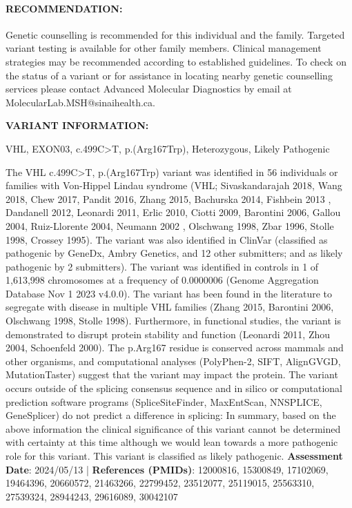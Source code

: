 \documentclass[10pt]{extarticle}
\begin{document}
\paragraph{RECOMMENDATION:} Genetic counselling is recommended for this individual and the family. Targeted variant testing is available for other family members. Clinical management strategies may be recommended according to established guidelines. To check on the status of a variant or for assistance in locating nearby genetic counselling services please contact Advanced Molecular Diagnostics by email at MolecularLab.MSH@sinaihealth.ca.

{\bf VARIANT INFORMATION:}\\
\hdashrule[0.5ex]{\textwidth}{1pt}{1mm}

\vspace{-1ex}
VHL, EXON03, c.499C>T, p.(Arg167Trp), Heterozygous, Likely Pathogenic

\vspace{-1ex}
\hdashrule[0.5ex]{\textwidth}{1pt}{1mm}

The VHL c.499C>T, p.(Arg167Trp) variant was identified in 56 individuals or families with Von-Hippel Lindau syndrome (VHL; Sivaskandarajah 2018, Wang 2018, Chew 2017, Pandit 2016, Zhang 2015, Bachurska 2014, Fishbein 2013 , Dandanell 2012, Leonardi 2011, Erlic 2010, Ciotti 2009, Barontini 2006, Gallou 2004, Ruiz-Llorente 2004, Neumann 2002 , Olschwang 1998, Zbar 1996, Stolle 1998, Crossey 1995). The variant was also identified in ClinVar (classified as pathogenic by GeneDx, Ambry Genetics, and 12 other submitters; and as likely pathogenic by 2 submitters). The variant was identified in controls in 1 of 1,613,998 chromosomes at a frequency of 0.0000006 (Genome Aggregation Database Nov 1 2023 v4.0.0). The variant has been found in the literature to segregate with disease in multiple VHL families (Zhang 2015, Barontini 2006, Olschwang 1998, Stolle 1998). Furthermore, in functional studies, the variant is demonstrated to disrupt protein stability and function (Leonardi 2011, Zhou 2004, Schoenfeld 2000). The p.Arg167 residue is conserved across mammals and other organisms, and computational analyses (PolyPhen-2, SIFT, AlignGVGD, MutationTaster) suggest that the variant may impact the protein. The variant occurs outside of the splicing consensus sequence and in silico or computational prediction software programs (SpliceSiteFinder, MaxEntScan, NNSPLICE, GeneSplicer) do not predict a difference in splicing: In summary, based on the above information the clinical significance of this variant cannot be determined with certainty at this time although we would lean towards a more pathogenic role for this variant. This variant is classified as likely  pathogenic.
{\bf Assessment Date}: 2024/05/13 | {\bf References (PMIDs)}: 12000816, 15300849, 17102069, 19464396, 20660572, 21463266, 22799452, 23512077, 25119015, 25563310, 27539324, 28944243, 29616089, 30042107
\end{document}
